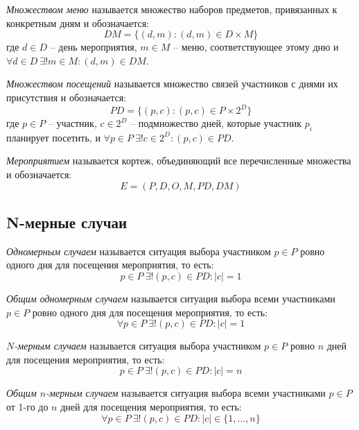 \textit{Множеством меню} называется множество наборов предметов, привязанных к конкретным дням и обозначается:
\begin{equation}
	DM = \{(d, m): (d, m) \in D \times M\}
\end{equation}
где $d \in D$ -- день мероприятия, $m \in M$ -- меню, соответствующее этому дню и $\forall d \in D \ \exists! m \in M: (d, m) \in DM$.

\textit{Множеством посещений} называется множество связей участников с днями их присутствия и обозначается:
\begin{equation}
	PD = \{(p, c): (p, c) \in P \times 2^D \}
\end{equation}
где $p \in P$ -- участник, $c \in 2^D$ -- подмножество дней, которые участник $p_i$ планирует посетить, и $\forall p \in P \ \exists! c \in 2^D: (p, c) \in PD$.

\textit{Мероприятием} называется кортеж, объединяющий все перечисленные множества и обозначается:
\begin{equation}
	E = (P, D, O, M, PD, DM)
\end{equation}

\subsection{N-мерные случаи}

\textit{Одномерным случаем} называется ситуация выбора участником $p \in P$ ровно одного дня для посещения мероприятия, то есть:
\begin{equation}
	p \in P \ \exists! (p, c) \in PD: |c| = 1
\end{equation}

\textit{Общим одномерным случаем} называется ситуация выбора всеми участниками $p \in P$ ровно одного дня для посещения мероприятия, то есть:
\begin{equation}
	\forall p \in P \ \exists! (p, c) \in PD: |c| = 1
\end{equation}

\textit{$N$-мерным случаем} называется ситуация выбора участником $p \in P$ ровно $n$ дней для посещения мероприятия, то есть:
\begin{equation}
	p \in P \ \exists! (p, c) \in PD: |c| = n
\end{equation}

\textit{Общим $n$-мерным случаем} называется ситуация выбора всеми участниками $p \in P$ от 1-го до $n$ дней для посещения мероприятия, то есть:
\begin{equation}
	\forall p \in P \ \exists! (p, c) \in PD: |c| \in \{1, \dots, n\}
\end{equation}


